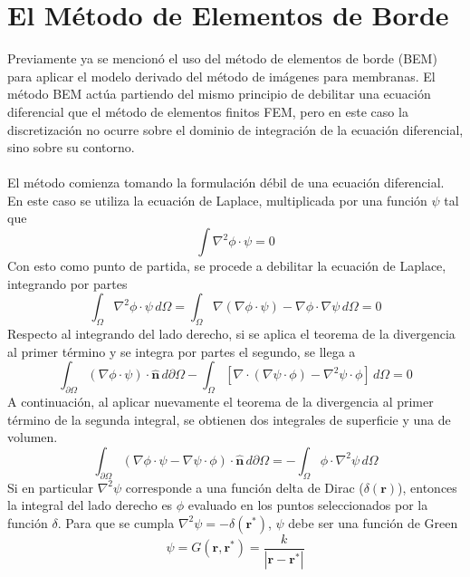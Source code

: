 \documentclass[12pt, twoside, onehalfspace, numbers, spanish]{ezthesis}
\numberwithin{equation}{section}
\begin{document}
\section{El Método de Elementos de Borde}\label{Sec:BEM_theory}
Previamente ya se mencionó el uso del método de elementos de borde (BEM) para aplicar el modelo derivado del método de imágenes para membranas. El método BEM actúa partiendo del mismo principio de debilitar una ecuación diferencial que el método de elementos finitos FEM, pero en este caso la discretización no ocurre sobre el dominio de integración de la ecuación diferencial, sino sobre su contorno.\\\\
El método comienza tomando la formulación débil de una ecuación diferencial. En este caso se utiliza la ecuación de Laplace, multiplicada por una función $\psi$ tal que
\begin{equation*}
\int\nabla^2 \phi\cdot\psi = 0
\end{equation*}
Con esto como punto de partida, se procede a debilitar la ecuación de Laplace, integrando por partes
\begin{equation*}
\int_\Omega \nabla^2\phi\cdot\psi\, d\Omega = \int_\Omega \nabla(\nabla \phi\cdot\psi) - \nabla\phi\cdot\nabla\psi\, d\Omega = 0
\end{equation*}
Respecto al integrando del lado derecho, si se aplica el teorema de la divergencia al primer término y se integra por partes el segundo, se llega a
\begin{equation*}
\int_{\partial\Omega} (\nabla\phi\cdot\psi)\cdot\hat{\mathbf{n}}\, d\partial\Omega - \int_\Omega [\nabla\cdot(\nabla\psi\cdot\phi) - \nabla^2\psi\cdot\phi]\, d\Omega = 0
\end{equation*}
A continuación, al aplicar nuevamente el teorema de la divergencia al primer término de la segunda integral, se obtienen dos integrales de superficie y una de volumen.
\begin{equation}\label{eqn:BIE_BEM}
\int_{\partial\Omega} (\nabla\phi\cdot\psi - \nabla\psi\cdot\phi) \cdot\hat{\mathbf{n}}\, d\partial\Omega = -\int_\Omega \phi\cdot\nabla^2\psi\, d\Omega
\end{equation}
Si en particular $\nabla^2\psi$ corresponde a una función delta de Dirac ($\delta(\mathbf{r})$), entonces la integral del lado derecho es $\phi$ evaluado en los puntos seleccionados por la función $\delta$. Para que se cumpla $\nabla^2\psi = -\delta(\mathbf{r}^*)$, $\psi$ debe ser una función de Green
\begin{equation}\label{eqn:Dirac_delta}
\psi = G(\mathbf{r},\mathbf{r}^*) = \frac{k}{|\mathbf{r} - \mathbf{r}^*|}
\end{equation}
\end{document}
